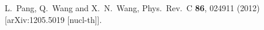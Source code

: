 \documentclass[3p,times,twocolumn]{elsarticle}
\begin{document}
\begin{thebibliography}{}
  L.~Pang, Q.~Wang and X.~N.~Wang,
  Phys.\ Rev.\ C {\bf 86}, 024911 (2012)
  [arXiv:1205.5019 [nucl-th]].





\end{thebibliography}








\end{document}
